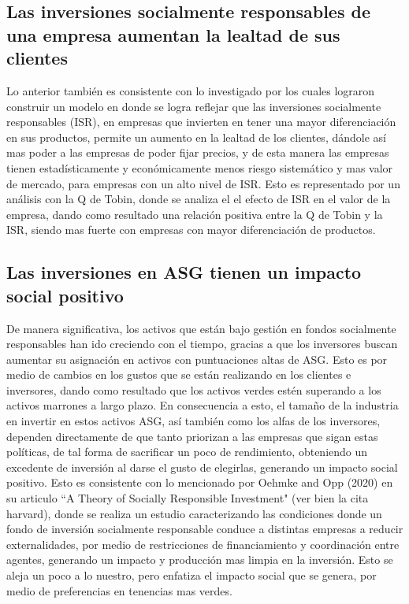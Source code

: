 \subsection{Las inversiones socialmente responsables de una empresa aumentan la lealtad de sus clientes}
Lo anterior también es consistente con lo investigado por  los cuales lograron construir un modelo en donde se logra reflejar que las inversiones socialmente responsables (ISR), en empresas que invierten en tener una mayor diferenciación en sus productos, permite un aumento en la lealtad de los clientes, dándole así mas poder a las empresas de poder fijar precios, y de esta manera las empresas tienen estadísticamente y económicamente menos riesgo sistemático y mas valor de mercado, para empresas con un alto nivel de ISR. Esto es representado por un análisis con la Q de Tobin, donde se analiza el el efecto de ISR en el valor de la empresa, dando como resultado una relación positiva entre la Q de Tobin y la ISR, siendo mas fuerte con empresas con mayor diferenciación de productos.
\vspace{0.5cm}
\subsection{Las inversiones en ASG tienen un impacto social positivo}

De manera significativa, los activos que están bajo gestión en fondos socialmente responsables han ido creciendo con el tiempo, gracias a que los inversores buscan aumentar su asignación en activos con puntuaciones altas de ASG. Esto es por medio de cambios en los gustos que se están realizando en los clientes e inversores, dando como resultado que los activos verdes estén superando a los activos marrones a largo plazo. En consecuencia a esto, el tamaño de la industria en invertir en estos activos ASG, así también como los alfas de los inversores, dependen directamente de que tanto priorizan a las empresas que sigan estas políticas, de tal forma de sacrificar un poco de rendimiento, obteniendo un excedente de inversión al darse el gusto de elegirlas, generando un impacto social positivo. Esto es consistente con lo mencionado por Oehmke and Opp (2020) en su articulo ``A Theory of Socially Responsible Investment" (ver bien la cita harvard), donde se realiza un estudio caracterizando las condiciones donde un fondo de inversión socialmente responsable conduce a distintas empresas a reducir externalidades, por medio de restricciones de financiamiento y coordinación entre agentes, generando un impacto y producción mas limpia en la inversión. Esto se aleja un poco a lo nuestro, pero enfatiza el impacto social que se genera, por medio de preferencias en tenencias mas verdes.

